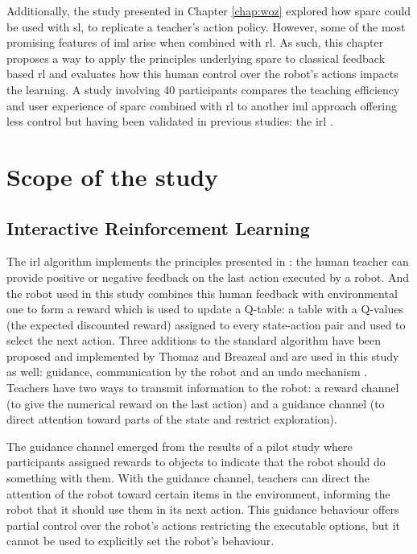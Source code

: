 Additionally, the study presented in Chapter \ref{chap:woz} explored how \gls{sparc} could be used with \acrlong{sl}, to replicate a teacher's action policy. However, some of the most promising features of \gls{iml} arise when combined with \gls{rl}. As such, this chapter proposes a way to apply the principles underlying \gls{sparc} to classical feedback based \gls{rl} and evaluates how this human control over the robot's actions impacts the learning. A study involving 40 participants compares the teaching efficiency and user experience of \gls{sparc} combined with \gls{rl} to another \gls{iml} approach offering less control but having been validated in previous studies: the \acrfull{irl} \citep{thomaz2008teachable}. %

\section{Scope of the study}

\subsection{Interactive Reinforcement Learning}

The \gls{irl} algorithm implements the principles presented in \cite{thomaz2008teachable}: the human teacher can provide positive or negative feedback on the last action executed by a robot. And the robot used in this study combines this human feedback with environmental one to form a reward which is used to update a Q-table: a table with a Q-values (the expected discounted reward) assigned to every state-action pair and used to select the next action. Three additions to the standard algorithm have been proposed and implemented by Thomaz and Breazeal and are used in this study as well: guidance, communication by the robot and an undo mechanism \citep{thomaz2008teachable}. Teachers have two ways to transmit information to the robot: a reward channel (to give the numerical reward on the last action) and a guidance channel (to direct attention toward parts of the state and restrict exploration).

The guidance channel emerged from the results of a pilot study where participants assigned rewards to objects to indicate that the robot should do something with them. With the guidance channel, teachers can direct the attention of the robot toward certain items in the environment, informing the robot that it should use them in its next action. This guidance behaviour offers partial control over the robot's actions restricting the executable options, but it cannot be used to explicitly set the robot's behaviour. 

